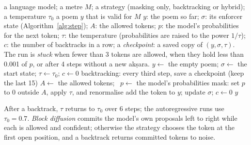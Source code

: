 \documentclass[11pt]{article}
\begin{document}
\begin{algorithm}[H]
\caption{Decoding with three strategies}\label{alg:decode}
\scriptsize
\begin{algorithmic}[1]
\Require a language model; a metre $M$; a strategy (masking only, backtracking or hybrid); a temperature
$\tau_0$
\Ensure a poem $y$ that is valid for $M$
\Symbols $y$: the poem so far; $\sigma$: its enforcer state (Algorithm~\ref{alg:step});
$A$: the allowed tokens; $p$: the model's probabilities for the next token; $\tau$: the temperature
(probabilities are raised to the power $1/\tau$); $c$: the number of backtracks in a row; a
\emph{checkpoint}: a saved copy of $(y, \sigma, \tau)$. The run is \emph{stuck} when fewer than 3 tokens
are allowed, when they hold less than 0.001 of $p$, or after 4 steps without a new akṣara.
\State $y \gets$ the empty poem; $\sigma \gets$ the start state; $\tau \gets \tau_0$; $c \gets 0$
  \State backtracking: every third step, save a checkpoint (keep the last 15)
  \State $A \gets$ the allowed tokens; \ $p \gets$ the model's probabilities
  \EndIf
  \State mask: set $p$ to 0 outside $A$, apply $\tau$, and renormalise
  \Else
  \EndIf
  \State add the token to $y$; update $\sigma$; $c \gets 0$
\EndWhile
\State \Return $y$
\end{algorithmic}
After a backtrack, $\tau$ returns to $\tau_0$ over 6 steps; the autoregressive runs use $\tau_0 = 0.7$.
\textit{Block diffusion} commits the model's own proposals left to right while each is allowed and
confident; otherwise the strategy chooses the token at the first open position, and a backtrack returns
committed tokens to noise.
\end{algorithm}
\end{document}
